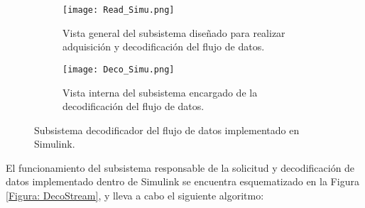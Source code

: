 \hfill \break

\begin{figure}[htbp]
	\centering
	\begin{subfigure}[htbp]{0.8\textwidth}
		\texttt{[image: Read\_Simu.png]}
		\caption{Vista general del subsistema diseñado para realizar adquisición y decodificación del flujo de datos.}
		\label{Figura: readSimu}
	\end{subfigure}
	\begin{subfigure}[htbp]{0.8\textwidth}
		\texttt{[image: Deco\_Simu.png]}
		\caption{Vista interna del subsistema encargado de la decodificación del flujo de datos.}
		\label{Figura: decoSimu}
	\end{subfigure}
	\caption[Subsistema decodificador del flujo de datos]{Subsistema decodificador del flujo de datos implementado en Simulink.}
	\label{Figura: DecoSimuT}
\end{figure}

\newpage
El funcionamiento del subsistema responsable de la solicitud y decodificación de datos implementado dentro de Simulink se encuentra esquematizado en la Figura \ref{Figura: DecoStream}, y lleva a cabo el siguiente algoritmo:

